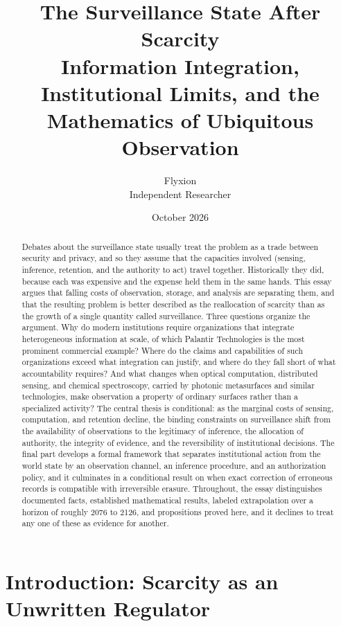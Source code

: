 \documentclass[11pt]{article}
\title{The Surveillance State After Scarcity\\[0.5em]
\large Information Integration, Institutional Limits, and the Mathematics of Ubiquitous Observation}
\author{Flyxion\\Independent Researcher}
\date{October 2026}
\theoremstyle{plain}
\theoremstyle{definition}
\theoremstyle{remark}
\begin{document}
\maketitle

\begin{abstract}
\noindent
Debates about the surveillance state usually treat the problem as a trade between security and privacy, and so they assume that the capacities involved (sensing, inference, retention, and the authority to act) travel together. Historically they did, because each was expensive and the expense held them in the same hands. This essay argues that falling costs of observation, storage, and analysis are separating them, and that the resulting problem is better described as the reallocation of scarcity than as the growth of a single quantity called surveillance. Three questions organize the argument. Why do modern institutions require organizations that integrate heterogeneous information at scale, of which Palantir Technologies is the most prominent commercial example? Where do the claims and capabilities of such organizations exceed what integration can justify, and where do they fall short of what accountability requires? And what changes when optical computation, distributed sensing, and chemical spectroscopy, carried by photonic metasurfaces and similar technologies, make observation a property of ordinary surfaces rather than a specialized activity? The central thesis is conditional: as the marginal costs of sensing, computation, and retention decline, the binding constraints on surveillance shift from the availability of observations to the legitimacy of inference, the allocation of authority, the integrity of evidence, and the reversibility of institutional decisions. The final part develops a formal framework that separates institutional action from the world state by an observation channel, an inference procedure, and an authorization policy, and it culminates in a conditional result on when exact correction of erroneous records is compatible with irreversible erasure. Throughout, the essay distinguishes documented facts, established mathematical results, labeled extrapolation over a horizon of roughly 2076 to 2126, and propositions proved here, and it declines to treat any one of these as evidence for another.
\end{abstract}

\section{Introduction: Scarcity as an Unwritten Regulator}
\end{document}
